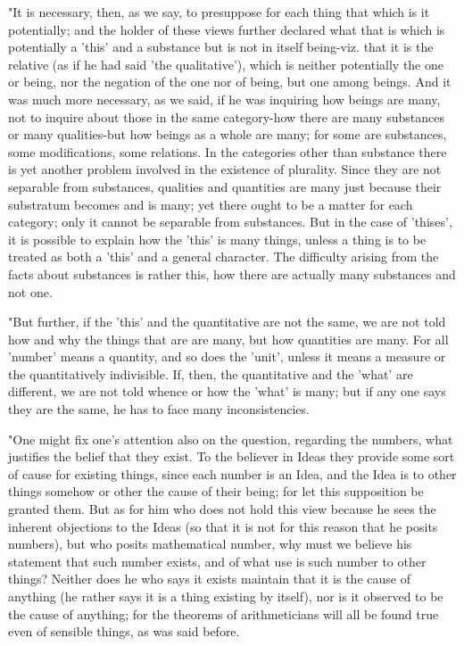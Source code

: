 "It is necessary, then, as we say, to presuppose for each thing that
which is it potentially; and the holder of these views further declared
what that is which is potentially a 'this' and a substance but is
not in itself being-viz. that it is the relative (as if he had said
'the qualitative'), which is neither potentially the one or being,
nor the negation of the one nor of being, but one among beings. And
it was much more necessary, as we said, if he was inquiring how beings
are many, not to inquire about those in the same category-how there
are many substances or many qualities-but how beings as a whole are
many; for some are substances, some modifications, some relations.
In the categories other than substance there is yet another problem
involved in the existence of plurality. Since they are not separable
from substances, qualities and quantities are many just because their
substratum becomes and is many; yet there ought to be a matter for
each category; only it cannot be separable from substances. But in
the case of 'thises', it is possible to explain how the 'this' is
many things, unless a thing is to be treated as both a 'this' and
a general character. The difficulty arising from the facts about substances
is rather this, how there are actually many substances and not one.

"But further, if the 'this' and the quantitative are not the same,
we are not told how and why the things that are are many, but how
quantities are many. For all 'number' means a quantity, and so does
the 'unit', unless it means a measure or the quantitatively indivisible.
If, then, the quantitative and the 'what' are different, we are not
told whence or how the 'what' is many; but if any one says they are
the same, he has to face many inconsistencies. 

"One might fix one's attention also on the question, regarding the
numbers, what justifies the belief that they exist. To the believer
in Ideas they provide some sort of cause for existing things, since
each number is an Idea, and the Idea is to other things somehow or
other the cause of their being; for let this supposition be granted
them. But as for him who does not hold this view because he sees the
inherent objections to the Ideas (so that it is not for this reason
that he posits numbers), but who posits mathematical number, why must
we believe his statement that such number exists, and of what use
is such number to other things? Neither does he who says it exists
maintain that it is the cause of anything (he rather says it is a
thing existing by itself), nor is it observed to be the cause of anything;
for the theorems of arithmeticians will all be found true even of
sensible things, as was said before. 


